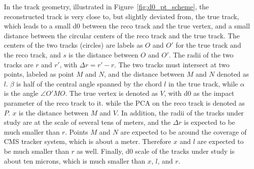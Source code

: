 In the track geometry, illustrated in Figure~\ref{fig:d0_pt_scheme}, 
the reconstructed track is very close to, but slightly deviated from, the true track,
which leads to a small d0 between the reco track and the true vertex, 
and a small distance between the circular centers of the reco track and the true track.
The centers of the two tracks (circles) are labels as $O$ and $O'$ for the true track and the reco track,
and $s$ is the distance between $O$ and $O'$. 
The radii of the two tracks are $r$ and $r'$, with $\Delta{}r = r' - r$.
The two tracks must intersect at two points, labeled as point $M$ and $N$, 
and the distance between $M$ and $N$ denoted as $l$.
$\beta$ is half of the central angle spanned by the chord $l$ in the true track,
while $\alpha$ is the angle $\angle O'MO$.
The true vertex is denoted as $V$, with d0 as the impact parameter of the reco track to it.
while the PCA on the reco track is denoted as $P$.
$x$ is the distance between $M$ and $V$.
In addition, the radii of the tracks under study are at the scale of several tens of meters,
and the $\Delta{}r$ is expected to be much smaller than $r$.
Points $M$ and $N$ are expected to be around the coverage of CMS tracker system, which is about a meter.
Therefore $x$ and $l$ are expected to be much smaller than $r$ as well.
Finally, d0 scale of the tracks under study is about ten microns, which is much smaller than $x$, $l$, and $r$. 

